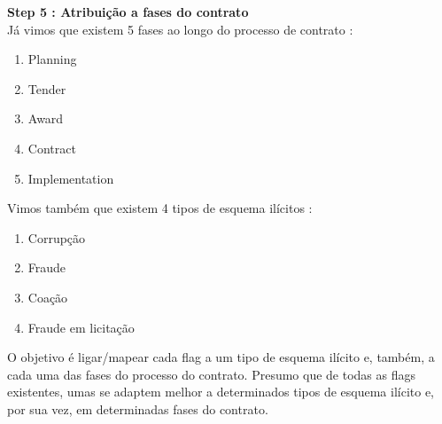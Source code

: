 \documentclass{book}
\begin{document}
\textbf{Step 5 :  Atribuição a fases do contrato}\\


Já vimos que existem 5 fases ao longo do processo de contrato : 

\begin{enumerate}
	
	\item Planning
	\item Tender
	\item Award
	\item Contract
	\item Implementation
	
\end{enumerate}


Vimos também que existem 4 tipos de esquema ilícitos : 

\begin{enumerate}
	
	\item Corrupção
	\item Fraude
	\item Coação
	\item Fraude em licitação
	
\end{enumerate}


O objetivo é ligar/mapear cada flag a um tipo de esquema ilícito e, também, a cada uma das fases do processo do contrato. 
Presumo que de todas as flags existentes, umas se adaptem melhor a determinados tipos de esquema ilícito e, por sua vez, em determinadas fases do contrato. 
\end{document}

